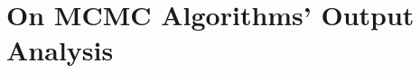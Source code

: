 \documentclass[report.tex]{subfiles}
\begin{document}
\chapter{On MCMC Algorithms' Output Analysis}
\label{mcmc-output-analysis}
\end{document}
